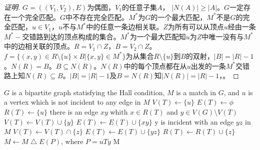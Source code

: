 \documentclass{beamer}
\theoremstyle{definition}
\theoremstyle{example}
\begin{document}
\begin{CJK}{UTF8}{gbsn}

    


\begin{frame}
  \begin{proof}[证明]\justifying\let\raggedright\justifying
    $G=((V_1,V_2),E)$为偶图，$V_1$的任意子集$A$， \pause$|N(A)| \geq |A|$。$G$一定存在一个完全匹配。$G$中不存在完全匹配。$M^*$为$G$的一个最大匹配，$M^*$不是$G$的完全匹配，$u\in V_1$，\pause$u$不与$M^*$中的任意一条边相关联。$Z$为所有可以从顶点$u$经由一条$M^*-$交错路到达的顶点构成的集合。$M^*$为一个最大匹配知$u$为$Z$中唯一没有与$M^*$中的边相关联的顶点。$R=V_1\cap Z$，\pause$B=V_2\cap Z$。$f=\{(x,y)\in R\setminus \{u\}\times B | \{x,y\}\in M^*\}$为从集合$R\setminus \{u\}$到$B$的双射，$|B|=|R|-1$。$N(R)=B$。$B\subseteq N(R)$。$N(R)$中的每个顶点都在从$u$出发的一条$M^*$交错路上知$N(R)\subseteq B$。$|B|=|R|-1$及$B= N(R)$知$|N(R)|=|R|-1$，。
  \end{proof}
\end{frame}

\begin{frame}
    \begin{codebox}
    \zi \Comment $G$ is a bipartite graph statisfying the Hall condition,
    \zi \Comment $M$ is a match in $G$,
    \zi \Comment and $u$ is a vertex which is not incident to any edge in $M$
    \li $V(T) \gets \{u\}$
    \li $E(T) \gets \phi$
    \li $R(T) \gets \{u\}$
    \li \While there is an edge $xy$ whith $x\in R(T)$ and $y\in V(G)\setminus V(T)$
    \li \Do
        $V(T) \gets V(T)\cup \{y\}$
    \li $E(T) \gets E(T)\cup \{xy\}$
    \li \If y is incident with an edge $yz$ in $M$
    \li \Do
    $V(T) \gets V(T)\cap \{z\}$
    \li $E(T) \gets E(T) \cup \{yz\}$
    \li $R(T) \gets R(T) \cup \{z\}$
    \Else 
    \li $M \gets M \bigtriangleup E(P)$, where $P=uTy$
    \li \Return M
    \End
    \End
  \end{codebox}


\end{frame}
\end{CJK}
\end{document}
